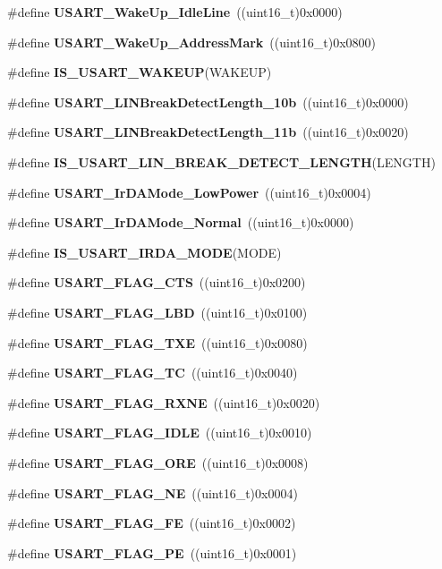 \begin{DoxyCompactItemize}
\item 
\#define \textbf{ U\+S\+A\+R\+T\+\_\+\+Wake\+Up\+\_\+\+Idle\+Line}~((uint16\+\_\+t)0x0000)
\item 
\#define \textbf{ U\+S\+A\+R\+T\+\_\+\+Wake\+Up\+\_\+\+Address\+Mark}~((uint16\+\_\+t)0x0800)
\item 
\#define \textbf{ I\+S\+\_\+\+U\+S\+A\+R\+T\+\_\+\+W\+A\+K\+E\+UP}(W\+A\+K\+E\+UP)
\item 
\#define \textbf{ U\+S\+A\+R\+T\+\_\+\+L\+I\+N\+Break\+Detect\+Length\+\_\+10b}~((uint16\+\_\+t)0x0000)
\item 
\#define \textbf{ U\+S\+A\+R\+T\+\_\+\+L\+I\+N\+Break\+Detect\+Length\+\_\+11b}~((uint16\+\_\+t)0x0020)
\item 
\#define \textbf{ I\+S\+\_\+\+U\+S\+A\+R\+T\+\_\+\+L\+I\+N\+\_\+\+B\+R\+E\+A\+K\+\_\+\+D\+E\+T\+E\+C\+T\+\_\+\+L\+E\+N\+G\+TH}(L\+E\+N\+G\+TH)
\item 
\#define \textbf{ U\+S\+A\+R\+T\+\_\+\+Ir\+D\+A\+Mode\+\_\+\+Low\+Power}~((uint16\+\_\+t)0x0004)
\item 
\#define \textbf{ U\+S\+A\+R\+T\+\_\+\+Ir\+D\+A\+Mode\+\_\+\+Normal}~((uint16\+\_\+t)0x0000)
\item 
\#define \textbf{ I\+S\+\_\+\+U\+S\+A\+R\+T\+\_\+\+I\+R\+D\+A\+\_\+\+M\+O\+DE}(M\+O\+DE)
\item 
\#define \textbf{ U\+S\+A\+R\+T\+\_\+\+F\+L\+A\+G\+\_\+\+C\+TS}~((uint16\+\_\+t)0x0200)
\item 
\#define \textbf{ U\+S\+A\+R\+T\+\_\+\+F\+L\+A\+G\+\_\+\+L\+BD}~((uint16\+\_\+t)0x0100)
\item 
\#define \textbf{ U\+S\+A\+R\+T\+\_\+\+F\+L\+A\+G\+\_\+\+T\+XE}~((uint16\+\_\+t)0x0080)
\item 
\#define \textbf{ U\+S\+A\+R\+T\+\_\+\+F\+L\+A\+G\+\_\+\+TC}~((uint16\+\_\+t)0x0040)
\item 
\#define \textbf{ U\+S\+A\+R\+T\+\_\+\+F\+L\+A\+G\+\_\+\+R\+X\+NE}~((uint16\+\_\+t)0x0020)
\item 
\#define \textbf{ U\+S\+A\+R\+T\+\_\+\+F\+L\+A\+G\+\_\+\+I\+D\+LE}~((uint16\+\_\+t)0x0010)
\item 
\#define \textbf{ U\+S\+A\+R\+T\+\_\+\+F\+L\+A\+G\+\_\+\+O\+RE}~((uint16\+\_\+t)0x0008)
\item 
\#define \textbf{ U\+S\+A\+R\+T\+\_\+\+F\+L\+A\+G\+\_\+\+NE}~((uint16\+\_\+t)0x0004)
\item 
\#define \textbf{ U\+S\+A\+R\+T\+\_\+\+F\+L\+A\+G\+\_\+\+FE}~((uint16\+\_\+t)0x0002)
\item 
\#define \textbf{ U\+S\+A\+R\+T\+\_\+\+F\+L\+A\+G\+\_\+\+PE}~((uint16\+\_\+t)0x0001)

\end{DoxyCompactItemize}
